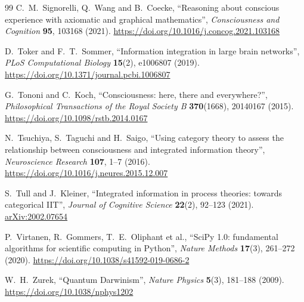 \begin{thebibliography}{99}
C.~M.~Signorelli, Q.~Wang and B.~Coecke, ``Reasoning about conscious experience with axiomatic and graphical mathematics'', \emph{Consciousness and Cognition} \textbf{95}, 103168 (2021).
\href{https://doi.org/10.1016/j.concog.2021.103168}{https://doi.org/10.1016/j.concog.2021.103168}

D.~Toker and F.~T.~Sommer, ``Information integration in large brain networks'', \emph{PLoS Computational Biology} \textbf{15}(2), e1006807 (2019).
\href{https://doi.org/10.1371/journal.pcbi.1006807}{https://doi.org/10.1371/journal.pcbi.1006807}

G.~Tononi and C.~Koch, ``Consciousness: here, there and everywhere?'', \emph{Philosophical Transactions of the Royal Society B} \textbf{370}(1668), 20140167 (2015).
\href{https://doi.org/10.1098/rstb.2014.0167}{https://doi.org/10.1098/rstb.2014.0167}

N.~Tsuchiya, S.~Taguchi and H.~Saigo, ``Using category theory to assess the relationship between consciousness and integrated information theory'', \emph{Neuroscience Research} \textbf{107}, 1--7 (2016).
\href{https://doi.org/10.1016/j.neures.2015.12.007}{https://doi.org/10.1016/j.neures.2015.12.007}

S.~Tull and J.~Kleiner, ``Integrated information in process theories: towards categorical IIT'', \emph{Journal of Cognitive Science} \textbf{22}(2), 92--123 (2021).
\href{https://arxiv.org/abs/2002.07654}{arXiv:2002.07654}

P.~Virtanen, R.~Gommers, T.~E.~Oliphant et al., ``SciPy 1.0: fundamental algorithms for scientific computing in Python'', \emph{Nature Methods} \textbf{17}(3), 261--272 (2020).
\href{https://doi.org/10.1038/s41592-019-0686-2}{https://doi.org/10.1038/s41592-019-0686-2}

W.~H.~Zurek, ``Quantum Darwinism'', \emph{Nature Physics} \textbf{5}(3), 181--188 (2009).
\href{https://doi.org/10.1038/nphys1202}{https://doi.org/10.1038/nphys1202}

\end{thebibliography}
